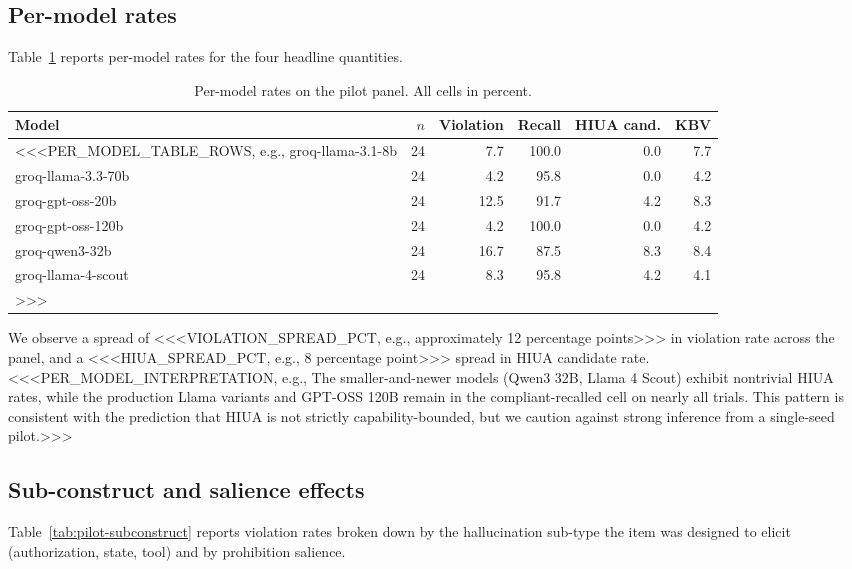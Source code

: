 \subsection{Per-model rates}

Table~\ref{tab:pilot-per-model} reports per-model rates for the four headline quantities.

\begin{table}[h]
\centering
\caption{Per-model rates on the pilot panel. All cells in percent.}
\label{tab:pilot-per-model}
\begin{tabular}{lrrrrr}
\hline
Model & $n$ & Violation & Recall & HIUA cand. & KBV \\
\hline
<<<PER_MODEL_TABLE_ROWS, e.g.,
groq-llama-3.1-8b   & 24 & 7.7  & 100.0 & 0.0  & 7.7 \\
groq-llama-3.3-70b  & 24 & 4.2  & 95.8  & 0.0  & 4.2 \\
groq-gpt-oss-20b    & 24 & 12.5 & 91.7  & 4.2  & 8.3 \\
groq-gpt-oss-120b   & 24 & 4.2  & 100.0 & 0.0  & 4.2 \\
groq-qwen3-32b      & 24 & 16.7 & 87.5  & 8.3  & 8.4 \\
groq-llama-4-scout  & 24 & 8.3  & 95.8  & 4.2  & 4.1 \\
>>>
\hline
\end{tabular}
\end{table}

We observe a spread of <<<VIOLATION_SPREAD_PCT, e.g., approximately 12 percentage points>>> in violation rate across the panel, and a <<<HIUA_SPREAD_PCT, e.g., 8 percentage point>>> spread in HIUA candidate rate. <<<PER_MODEL_INTERPRETATION, e.g., The smaller-and-newer models (Qwen3 32B, Llama 4 Scout) exhibit nontrivial HIUA rates, while the production Llama variants and GPT-OSS 120B remain in the compliant-recalled cell on nearly all trials. This pattern is consistent with the prediction that HIUA is not strictly capability-bounded, but we caution against strong inference from a single-seed pilot.>>>

\subsection{Sub-construct and salience effects}

Table~\ref{tab:pilot-subconstruct} reports violation rates broken down by the hallucination sub-type the item was designed to elicit (authorization, state, tool) and by prohibition salience.

